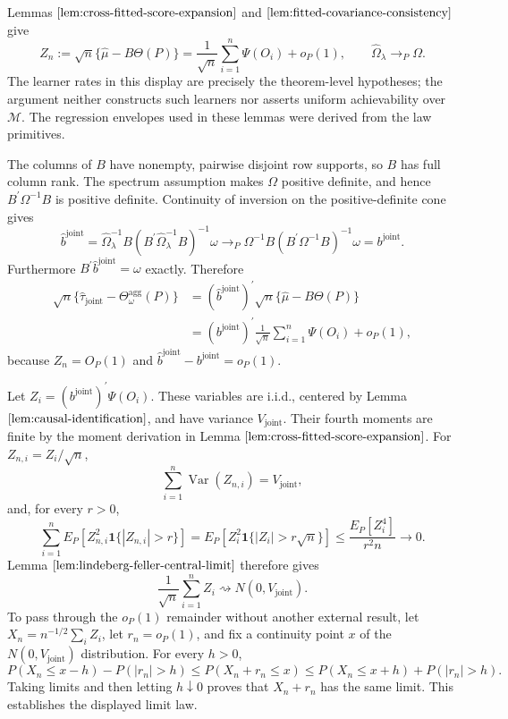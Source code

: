 Lemmas \(\ref{lem:cross-fitted-score-expansion}\) and \(\ref{lem:fitted-covariance-consistency}\) give
\[
 Z_n:=\sqrt n\{\widehat\mu-B\Theta(P)\}
 =\frac1{\sqrt n}\sum_{i=1}^n\Psi(O_i)+o_P(1),
 \qquad
 \widehat\Omega_\lambda\to_P\Omega.
\]
The learner rates in this display are precisely the theorem-level hypotheses; the argument neither constructs such learners nor asserts uniform achievability over \(\mathcal M\).  The regression envelopes used in these lemmas were derived from the law primitives.

The columns of \(B\) have nonempty, pairwise disjoint row supports, so \(B\) has full column rank.  The spectrum assumption makes \(\Omega\) positive definite, and hence \(B^{\prime}\Omega^{-1}B\) is positive definite.  Continuity of inversion on the positive-definite cone gives
\[
 \widehat b^{\mathrm{joint}}
 =\widehat\Omega_\lambda^{-1}B
 (B^{\prime}\widehat\Omega_\lambda^{-1}B)^{-1}\omega
 \to_P
 \Omega^{-1}B(B^{\prime}\Omega^{-1}B)^{-1}\omega
 =b^{\mathrm{joint}}.
\]
Furthermore \(B^{\prime}\widehat b^{\mathrm{joint}}=\omega\) exactly.  Therefore
\[
\begin{aligned}
 \sqrt n\{\widehat\tau_{\mathrm{joint}}-\Theta_\omega^{\mathrm{agg}}(P)\}
 &=(\widehat b^{\mathrm{joint}})^{\prime}
   \sqrt n\{\widehat\mu-B\Theta(P)\}\\
 &=(b^{\mathrm{joint}})^{\prime}\frac1{\sqrt n}
   \sum_{i=1}^n\Psi(O_i)+o_P(1),
\end{aligned}
\]
because \(Z_n=O_P(1)\) and \(\widehat b^{\mathrm{joint}}-b^{\mathrm{joint}}=o_P(1)\).

Let \(Z_i=(b^{\mathrm{joint}})^{\prime}\Psi(O_i)\).  These variables are i.i.d., centered by Lemma \(\ref{lem:causal-identification}\), and have variance \(V_{\mathrm{joint}}\).  Their fourth moments are finite by the moment derivation in Lemma \(\ref{lem:cross-fitted-score-expansion}\).  For \(Z_{n,i}=Z_i/\sqrt n\),
\[
 \sum_{i=1}^n\operatorname{Var}(Z_{n,i})=V_{\mathrm{joint}},
\]
and, for every \(r>0\),
\[
 \sum_{i=1}^nE_P[Z_{n,i}^2\mathbf 1\{|Z_{n,i}|>r\}]
 =E_P[Z_i^2\mathbf 1\{|Z_i|>r\sqrt n\}]
 \le\frac{E_P[Z_i^4]}{r^2n}\longrightarrow0.
\]
Lemma \(\ref{lem:lindeberg-feller-central-limit}\) therefore gives
\[
 \frac1{\sqrt n}\sum_{i=1}^nZ_i\rightsquigarrow N(0,V_{\mathrm{joint}}).
\]
To pass through the \(o_P(1)\) remainder without another external result, let \(X_n=n^{-1/2}\sum_iZ_i\), let \(r_n=o_P(1)\), and fix a continuity point \(x\) of the \(N(0,V_{\mathrm{joint}})\) distribution.  For every \(h>0\),
\[
 P(X_n\le x-h)-P(|r_n|>h)
 \le P(X_n+r_n\le x)
 \le P(X_n\le x+h)+P(|r_n|>h).
\]
Taking limits and then letting \(h\downarrow0\) proves that \(X_n+r_n\) has the same limit.  This establishes the displayed limit law.

